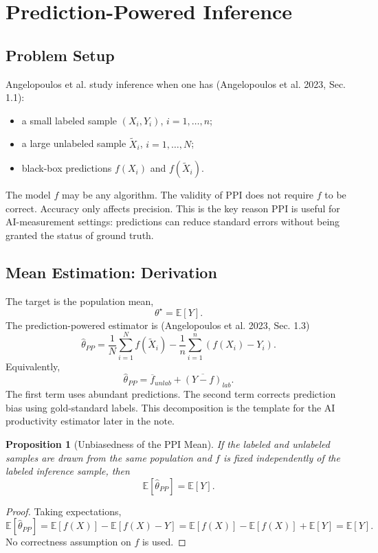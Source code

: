 \documentclass[11pt]{article}
\newtheorem{proposition}{Proposition}
\newcommand{\E}{\mathbb{E}}
\begin{document}
\section{Prediction-Powered Inference}

\subsection{Problem Setup}

Angelopoulos et al. study inference when one has (Angelopoulos et al. 2023, Sec. 1.1):
\begin{itemize}[leftmargin=*]
  \item a small labeled sample $(X_i,Y_i)$, $i=1,\ldots,n$;
  \item a large unlabeled sample $\widetilde X_i$, $i=1,\ldots,N$;
  \item black-box predictions $f(X_i)$ and $f(\widetilde X_i)$.
\end{itemize}
The model $f$ may be any algorithm. The validity of PPI does not require $f$ to be correct. Accuracy only affects precision. This is the key reason PPI is useful for AI-measurement settings: predictions can reduce standard errors without being granted the status of ground truth.

\subsection{Mean Estimation: Derivation}

The target is the population mean,
\[
  \theta^\star=\E[Y].
\]
The prediction-powered estimator is (Angelopoulos et al. 2023, Sec. 1.3)
\[
  \widehat\theta_{PP}
  =
  \frac{1}{N}\sum_{i=1}^N f(\widetilde X_i)
  -
  \frac{1}{n}\sum_{i=1}^n\left(f(X_i)-Y_i\right).
\]
Equivalently,
\[
  \widehat\theta_{PP}
  =
  \overline f_{unlab}
  +
  \overline{(Y-f)}_{lab}.
\]
The first term uses abundant predictions. The second term corrects prediction bias using gold-standard labels. This decomposition is the template for the AI productivity estimator later in the note.

\begin{proposition}[Unbiasedness of the PPI Mean]
If the labeled and unlabeled samples are drawn from the same population and $f$ is fixed independently of the labeled inference sample, then
\[
  \E[\widehat\theta_{PP}]=\E[Y].
\]
\end{proposition}

\begin{proof}
Taking expectations,
\[
  \E[\widehat\theta_{PP}]
  =
  \E[f(X)]-\E[f(X)-Y]
  =
  \E[f(X)]-\E[f(X)]+\E[Y]
  =
  \E[Y].
\]
No correctness assumption on $f$ is used.
\end{proof}
\end{document}
